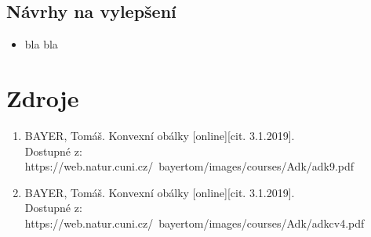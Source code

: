 \documentclass[a4paper, 12pt]{article}
\begin{document}
\subsection{Návrhy na vylepšení}

\begin{itemize}
\item bla bla
\end{itemize}

\clearpage
\section{Zdroje}

\begin{enumerate}
\item  BAYER, Tomáš. Konvexní obálky [online][cit. 3.1.2019]. \\
Dostupné z: https://web.natur.cuni.cz/~bayertom/images/courses/Adk/adk9.pdf  \\

\item  BAYER, Tomáš. Konvexní obálky [online][cit. 3.1.2019]. \\
Dostupné z: https://web.natur.cuni.cz/~bayertom/images/courses/Adk/adkcv4.pdf\\
\end{enumerate}
\end{document}
